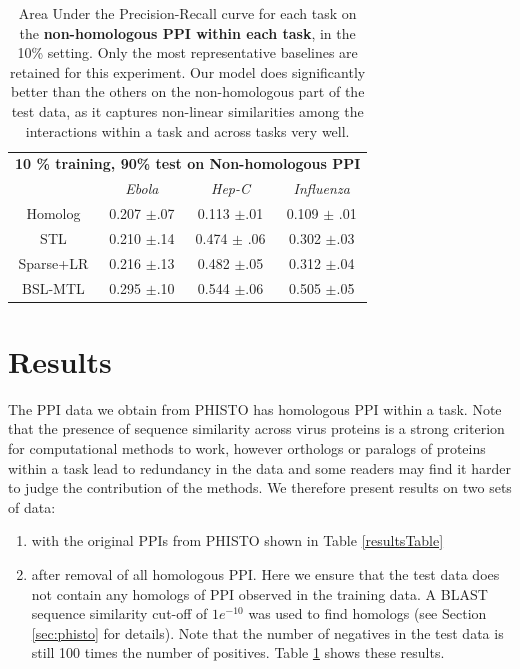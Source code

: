 \documentclass{bioinfo}
\begin{document}
\begin{table}\caption{Area Under the Precision-Recall curve for each task on the \textbf{non-homologous PPI within each task}, in the 10\% setting. Only the most representative baselines are retained for this experiment. Our model does significantly better than the others on the non-homologous part of the test data, as it captures non-linear similarities among the interactions within a task and across tasks very well.}
\label{homresultsTable}
\begin{small}
\begin{center}
\def\arraystretch{1.2}
\begin{tabular}{c|ccc}
\toprule
\multicolumn{4}{c}{\textbf{10 \% training, 90\% test on Non-homologous PPI}} \\
& \textit{Ebola} & \textit{Hep-C} & \textit{Influenza} \\ \midrule
Homolog & 0.207 $\pm$.07 & 0.113 $\pm$.01 & 0.109 $\pm$ .01 \\
STL  & 0.210 $\pm$.14 & 0.474 $\pm$ .06 & 0.302 $\pm$.03 \\
Sparse+LR & 0.216 $\pm$.13 & 0.482 $\pm$.05 & 0.312 $\pm$.04 \\ 
BSL-MTL & 0.295 $\pm$.10 & 0.544 $\pm$.06 & 0.505 $\pm$.05 \\ \bottomrule
\end{tabular}
\end{center}
\end{small}
\end{table}


\section{Results}
The PPI data we obtain from PHISTO has homologous PPI within a task. Note that the presence of sequence similarity across virus proteins is a strong criterion for computational methods to work, however orthologs or paralogs of proteins within a task lead to redundancy in the data and some readers may find it harder to judge the contribution of the methods. We therefore present results on two sets of data: 
\begin{enumerate}[a]
\item with the original PPIs from PHISTO shown in Table \ref{resultsTable}
\item after removal of all homologous PPI. Here we ensure that the test data does not contain any homologs of PPI observed in the training data. A BLAST sequence similarity cut-off of $1e^{-10}$ was used to find homologs (see Section \ref{sec:phisto} for details). Note that the number of negatives in the test data is still 100 times the number of positives. Table \ref{homresultsTable} shows these results. 
\end{enumerate}
\end{document}
